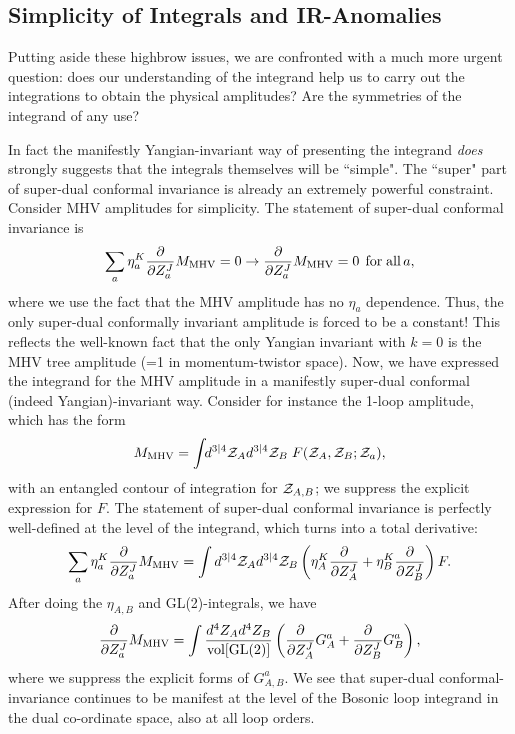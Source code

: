 \documentclass[11pt, reqno]{article}
\newcommand{\be}{\begin{eqnarray}}
\newcommand{\ee}{\end{eqnarray}}
\begin{document}
\subsection{Simplicity of Integrals and IR-Anomalies}

Putting aside these highbrow issues, we are confronted with a much more urgent question: does our understanding of the integrand help us to carry out the integrations to obtain the physical amplitudes? Are the symmetries of the integrand of any use?


In fact the manifestly Yangian-invariant way of presenting the
integrand {\it does} strongly suggests that the integrals themselves will be
``simple". The ``super" part of super-dual conformal
invariance is already an extremely powerful constraint. Consider MHV
amplitudes  for simplicity. The statement of super-dual conformal
invariance is\vspace{-0.25cm}
\begin{equation}
\sum_a \eta^K_a \frac{\partial}{\partial Z_a^J} M_{{\rm MHV}} = 0
\rightarrow \frac{\partial}{\partial Z^J_a} M_{{\rm MHV}} = 0 \,\; {\rm
for}\; {\rm all} \, a,\vspace{-0.2cm}\end{equation}
where we use the fact that the MHV amplitude has no $\eta_a$
dependence. Thus, the only super-dual conformally invariant amplitude
is forced to be a constant! This reflects the well-known fact
that the only Yangian invariant with $k=0$ is the MHV tree amplitude
(=1 in momentum-twistor space).
Now, we have expressed the integrand for the MHV amplitude in a
manifestly super-dual conformal (indeed Yangian)-invariant way.
Consider for instance the 1-loop amplitude, which has the form\vspace{-0.15cm}
\begin{equation}
M_{{\rm MHV}} = \int\!\!d^{3|4}{\cal Z}_A d^{3|4} {\cal Z}_B \;F({\cal
Z}_A,{\cal Z}_B; {\cal Z}_a),
\end{equation}
with an entangled contour of integration for ${\cal Z}_{A,B}$; we
suppress the explicit expression for $F$.  The statement of super-dual
conformal invariance is perfectly well-defined at the level of the
integrand, which turns into a total derivative:\vspace{-0.1cm}
\begin{equation}
\sum_a \eta^K_a \frac{\partial}{\partial Z_a^J} M_{{\rm
MHV}} = \int  d^{3|4} {\cal Z}_A d^{3|4} {\cal Z}_B \left( \eta_A^K
\frac{\partial}{\partial Z^J_A} + \eta_B^K \frac{\partial}{\partial
Z^J_B} \right) F.
\end{equation}
After doing the $\eta_{A,B}$ and GL(2)-integrals, we have
\be
\frac{\partial}{\partial Z_a^J} M_{{\rm MHV}} = \int \frac{d^4 Z_A d^4
Z_B}{{\rm vol[GL(2)]}} \left( \frac{\partial}{\partial Z^J_A} G^a_A +
\frac{\partial}{\partial Z^J_B} G^a_B \right),\ee
where we suppress the explicit forms of $G^a_{A,B}$. We see that
super-dual conformal-invariance continues to be manifest at the level of
the Bosonic loop integrand in the dual co-ordinate space, also at all loop orders.
\end{document}
